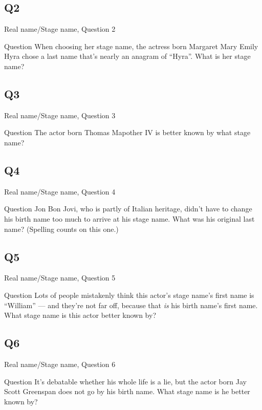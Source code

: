 \documentclass[11pt]{beamer}
\begin{document}
\subsection*{Q2}
\begin{frame}[t]{Real name/Stage name, Question 2}
\begin{block}{Question}
When choosing her stage name, the actress born Margaret Mary Emily Hyra chose a last name that's nearly an anagram of ``Hyra''. What is her stage name?
\end{block}
\end{frame}
\subsection*{Q3}
\begin{frame}[t]{Real name/Stage name, Question 3}
\begin{block}{Question}
The actor born Thomas Mapother IV is better known by what stage name?
\end{block}
\end{frame}
\subsection*{Q4}
\begin{frame}[t]{Real name/Stage name, Question 4}
\begin{block}{Question}
Jon Bon Jovi, who is partly of  Italian heritage, didn't have to change his birth name too much to arrive at his stage name. What was his original last name? (Spelling counts on this one.)
\end{block}
\end{frame}
\subsection*{Q5}
\begin{frame}[t]{Real name/Stage name, Question 5}
\begin{block}{Question}
Lots of people mistakenly think this actor's stage name's first name is ``William'' --- and they're not far off, because that \emph{is} his birth name's first name. What stage name is this actor better known by?
\end{block}
\end{frame}
\subsection*{Q6}
\begin{frame}[t]{Real name/Stage name, Question 6}
\begin{block}{Question}
It's debatable whether his whole life is a lie, but the actor born Jay Scott Greenspan does not go by his birth name. What stage name is he better known by?
\end{block}
\end{frame}
\end{document}
